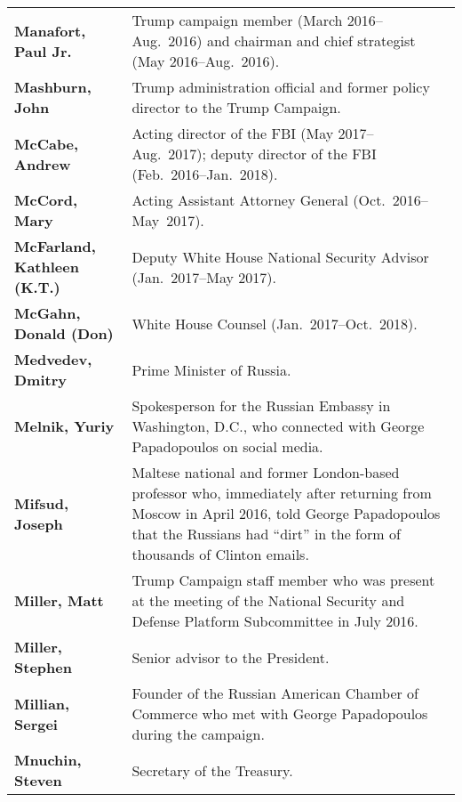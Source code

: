 \begin{longtable}{ p{} p{} }
    \textbf{Manafort, Paul Jr.} & Trump campaign member (March 2016--Aug.~2016) and chairman and chief strategist (May 2016--Aug.~2016). \\

    \textbf{Mashburn, John} & Trump administration official and former policy director to the Trump Campaign. \\

    \textbf{McCabe, Andrew} & Acting director of the FBI (May 2017--Aug.~2017); deputy director of the FBI (Feb.~2016--Jan.~2018). \\

    \textbf{McCord, Mary} & Acting Assistant Attorney General (Oct.~2016--May~2017). \\

    \textbf{McFarland, Kathleen (K.T.)} & Deputy White House National Security Advisor (Jan.~2017--May 2017). \\

    \textbf{McGahn, Donald (Don)} & White House Counsel (Jan.~2017--Oct.~2018). \\

    \textbf{Medvedev, Dmitry} & Prime Minister of Russia. \\

    \textbf{Melnik, Yuriy} & Spokesperson for the Russian Embassy in Washington, D.C., who connected with George Papadopoulos on social media. \\

    \textbf{Mifsud, Joseph} & Maltese national and former London-based professor who, immediately after returning from Moscow in April 2016, told George Papadopoulos that the Russians had ``dirt'' in the form of thousands of Clinton emails. \\

    \textbf{Miller, Matt} & Trump Campaign staff member who was present at the meeting of the National Security and Defense Platform Subcommittee in July 2016. \\

    \textbf{Miller, Stephen} & Senior advisor to the President.  \\

    \textbf{Millian, Sergei} & Founder of the Russian American Chamber of Commerce who met with George Papadopoulos during the campaign. \\

    \textbf{Mnuchin, Steven} & Secretary of the Treasury. \\


\end{longtable}
